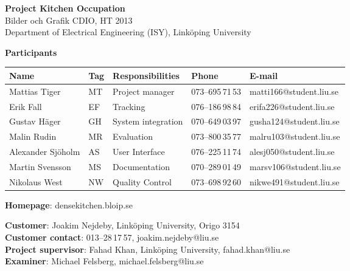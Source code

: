 \begin{center}
    \vspace*{4\baselineskip}

	\textbf{\huge Project Kitchen Occupation} \\
	\vspace*{0.5\baselineskip}
	Bilder och Grafik CDIO, HT 2013 \\
	Department of Electrical Engineering (ISY), Link\"{o}ping University
	
	\vspace*{2\baselineskip}
	\textbf{\LARGE Participants}


	{\footnotesize 
	\begin{tabular}{|p{2.7cm}|p{1cm}|p{5cm}|p{2cm}|p{3.4cm}|}
		\hline
		\textbf{Name} & \textbf{Tag} & \textbf{Responsibilities} & \textbf{Phone} & \textbf{E-mail} \\
		\hline
		Mattias Tiger & MT & Project manager & 073--695\,71\,53 & matti166@student.liu.se \\
		\hline
		Erik Fall & EF & Tracking & 076--186\,98\,84 & erifa226@student.liu.se \\
		\hline
		Gustav Häger & GH & System integration & 070--649\,03\,97 & gusha124@student.liu.se \\
		\hline
		Malin Rudin & MR & Evaluation & 073--800\,35\,77 & malru103@student.liu.se \\
		\hline
		Alexander Sjöholm & AS & User Interface & 076--225\,11\,74 & alesj050@student.liu.se \\
		\hline
		Martin Svensson & MS & Documentation & 070--289\,01\,49 & marsv106@student.liu.se \\
		\hline
		Nikolaus West & NW & Quality Control & 073--698\,92\,60 & nikwe491@student.liu.se \\
		\hline
	\end{tabular}
	}

{\footnotesize 
\vspace{0.5\baselineskip}
\textbf{Homepage}: densekitchen.bloip.se \\
\vspace{1\baselineskip}

\textbf{Customer}: Joakim Nejdeby, Link\"{o}ping University, Origo 3154 \\
\textbf{Customer contact}: 013--28\,17\,57, joakim.nejdeby@liu.se \\
\textbf{Project supervisor}: Fahad Khan, Link\"{o}ping University, fahad.khan@liu.se \\
\textbf{Examiner}: Michael Felsberg, michael.felsberg@liu.se \\
}

\end{center}
